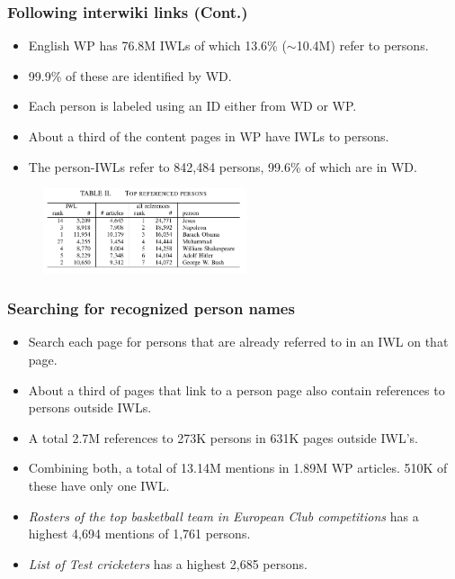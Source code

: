 \documentclass[10pt, compress]{beamer}
\begin{document}
\begin{frame}[fragile]
	\frametitle{Following interwiki links (Cont.)}
\begin{itemize}
\item English WP has 76.8M IWLs of which 13.6\% ($\sim$10.4M) refer to persons.
\item 99.9\% of these are identified by WD.
\item Each person is labeled using an ID either from WD or WP.
\item About a third of the content pages in WP have IWLs to persons.
\item The person-IWLs refer to 842,484 persons, 99.6\% of which are in WD.
\end{itemize}
\begin{figure}
  \centering
 \includegraphics[width=6cm,height=2.5cm]{Table2.png}
\end{figure}
\end{frame}

\begin{frame}[fragile]
	\frametitle{Searching for recognized person names}
\begin{itemize}
\item Search each page for persons that are already referred to in an IWL on that page.
\item About a third of pages that link to a person page also contain references to persons outside IWLs.
\item A total 2.7M references to 273K persons in 631K pages outside IWL's.
\item Combining both, a total of 13.14M mentions in 1.89M WP articles. 510K of these have only one IWL.
\item \textit{Rosters of the top basketball team in European Club competitions} has a highest 4,694 mentions of 1,761 persons.
\item \textit{List of Test cricketers} has a highest 2,685 persons.
\end{itemize}
\end{frame}
\end{document}
